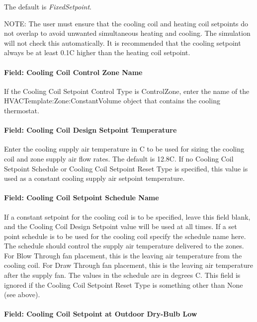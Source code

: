 The default is \emph{FixedSetpoint}.

NOTE: The user must ensure that the cooling coil and heating coil setpoints do not overlap to avoid unwanted simultaneous heating and cooling. The simulation will not check this automatically. It is recommended that the cooling setpoint always be at least 0.1C higher than the heating coil setpoint.

\paragraph{Field: Cooling Coil Control Zone Name}\label{field-cooling-coil-control-zone-name}

If the Cooling Coil Setpoint Control Type is ControlZone, enter the name of the HVACTemplate:Zone:ConstantVolume object that contains the cooling thermostat.

\paragraph{Field: Cooling Coil Design Setpoint Temperature}\label{field-cooling-coil-design-setpoint-temperature}

Enter the cooling supply air temperature in C to be used for sizing the cooling coil and zone supply air flow rates. The default is 12.8C. If no Cooling Coil Setpoint Schedule or Cooling Coil Setpoint Reset Type is specified, this value is used as a constant cooling supply air setpoint temperature.

\paragraph{Field: Cooling Coil Setpoint Schedule Name}\label{field-cooling-coil-setpoint-schedule-name-2}

If a constant setpoint for the cooling coil is to be specified, leave this field blank, and the Cooling Coil Design Setpoint value will be used at all times. If a set point schedule is to be used for the cooling coil specify the schedule name here. The schedule should control the supply air temperature delivered to the zones. For Blow Through fan placement, this is the leaving air temperature from the cooling coil. For Draw Through fan placement, this is the leaving air temperature after the supply fan. The values in the schedule are in degrees C. This field is ignored if the Cooling Coil Setpoint Reset Type is something other than None (see above).

\paragraph{Field: Cooling Coil Setpoint at Outdoor Dry-Bulb Low}\label{field-cooling-coil-setpoint-at-outdoor-dry-bulb-low}

